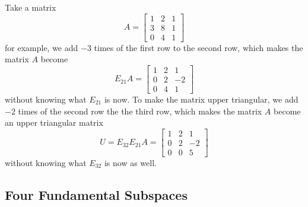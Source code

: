 \documentclass[11pt]{article}
\theoremstyle{break}
\theoremstyle{no_label}
\numberwithin{equation}{theorem}
\begin{document}
Take a matrix $$A=\begin{bmatrix}
    1 & 2 & 1 \\
    3 & 8 & 1 \\
    0 & 4 & 1
\end{bmatrix}$$ for example, we add $-3$ times of the first row to the second row, which makes the matrix $A$ become $$E_{21}A=\begin{bmatrix}
    1 & 2 & 1 \\
    0 & 2 & -2 \\
    0 & 4 & 1
\end{bmatrix}$$ without knowing what $E_{21}$ is now. To make the matrix upper triangular, we add $-2$ times of the second row the the third row, which makes the matrix $A$ become an upper triangular matrix $$U=E_{32}E_{21}A=\begin{bmatrix}
    1 & 2 & 1 \\
    0 & 2 & -2 \\
    0 & 0 & 5
\end{bmatrix}$$
without knowing what $E_{32}$ is now as well.

\subsection{Four Fundamental Subspaces}
\end{document}
